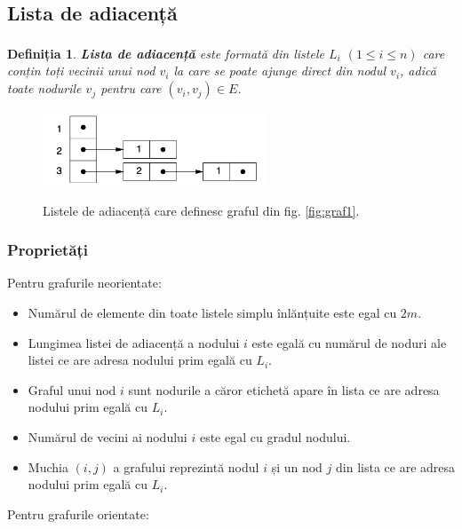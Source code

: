 \documentclass[9pt,a4paper]{report}
\newtheorem{definitie}{Definiția}
\begin{document}
\subsection{Lista de adiacență}

\begin{definitie}
    \textbf{Lista de adiacență}\textsuperscript{\cite{milosescu}} este formată din listele $L_i$ $(1 \leq i \leq n)$ care conțin toți vecinii unui nod $v_i$ la care se poate ajunge direct din nodul $v_i$, adică toate nodurile $v_j$ pentru care $(v_i, v_j) \in E$.
\end{definitie}

\begin{figure}[htbp]
    \centering
    \includegraphics[width=0.6\textwidth]{img/adjacency_lists.png}
    \label{fig:graf3}
    \caption{Listele de adiacență care definesc graful din fig. \ref{fig:graf1}.}
\end{figure}

\subsubsection*{Proprietăți}

Pentru grafurile neorientate:

\begin{itemize}
    \item Numărul de elemente din toate listele simplu înlănțuite este egal cu $2m$.
    \item Lungimea listei de adiacență a nodului $i$ este egală cu numărul de noduri ale listei ce are adresa nodului prim egală cu $L_i$.
    \item Graful unui nod $i$ sunt nodurile a căror etichetă apare în lista ce are adresa nodului prim egală cu $L_i$.
    \item Numărul de vecini ai nodului $i$ este egal cu gradul nodului.
    \item Muchia $(i,j)$ a grafului reprezintă nodul $i$ și un nod $j$ din lista ce are adresa nodului prim egală cu $L_i$.
\end{itemize}

Pentru grafurile orientate:
\end{document}
